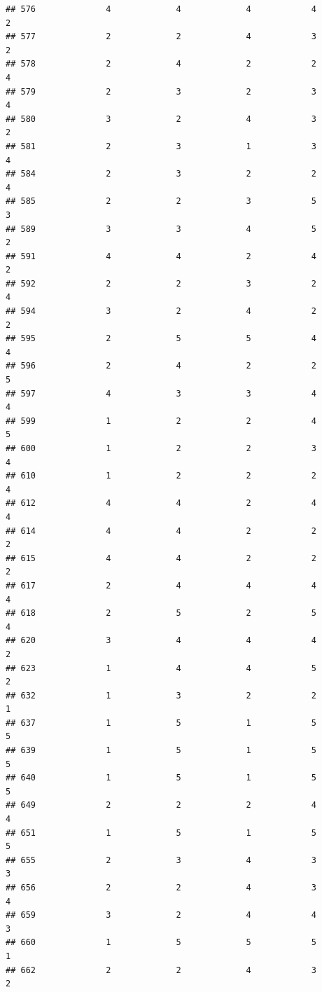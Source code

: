 \documentclass[
]{article}
\begin{document}
\begin{verbatim}
## 576              4             4             4            4          2
## 577              2             2             4            3          2
## 578              2             4             2            2          4
## 579              2             3             2            3          4
## 580              3             2             4            3          2
## 581              2             3             1            3          4
## 584              2             3             2            2          4
## 585              2             2             3            5          3
## 589              3             3             4            5          2
## 591              4             4             2            4          2
## 592              2             2             3            2          4
## 594              3             2             4            2          2
## 595              2             5             5            4          4
## 596              2             4             2            2          5
## 597              4             3             3            4          4
## 599              1             2             2            4          5
## 600              1             2             2            3          4
## 610              1             2             2            2          4
## 612              4             4             2            4          4
## 614              4             4             2            2          2
## 615              4             4             2            2          2
## 617              2             4             4            4          4
## 618              2             5             2            5          4
## 620              3             4             4            4          2
## 623              1             4             4            5          2
## 632              1             3             2            2          1
## 637              1             5             1            5          5
## 639              1             5             1            5          5
## 640              1             5             1            5          5
## 649              2             2             2            4          4
## 651              1             5             1            5          5
## 655              2             3             4            3          3
## 656              2             2             4            3          4
## 659              3             2             4            4          3
## 660              1             5             5            5          1
## 662              2             2             4            3          2

\end{verbatim}
\end{document}
